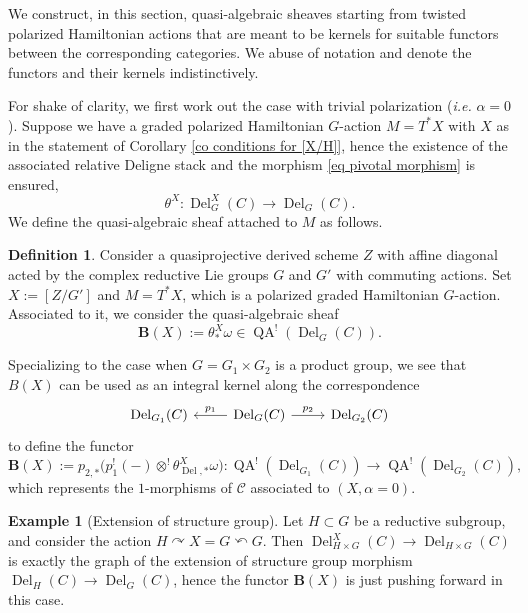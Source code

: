 \documentclass[11pt, a4paper]{amsart}
\numberwithin{equation}{section}
\theoremstyle{definition}
\newtheorem{definition}[theorem]{Definition}
\newtheorem{example}[theorem]{Example}
\theoremstyle{remark}
\DeclareMathOperator{\Del}{Del}
\DeclareMathOperator{\QA}{QA}
\newcommand{\Cc}{\mathcal{C}}
\newcommand{\bB}{\mathbf{B}}
\renewcommand{\to}{\longrightarrow}
\newcommand{\acts}{\curvearrowright}
\newcommand{\racts}{\curvearrowleft}
\begin{document}
We construct, in this section, quasi-algebraic sheaves starting from twisted polarized Hamiltonian actions that are meant to be kernels for suitable functors between the corresponding categories. We abuse of notation and denote the functors and their kernels indistinctively.  

For shake of clarity, we first work out the case with trivial polarization ({\it i.e.} $\alpha = 0$). Suppose we have a graded polarized Hamiltonian $G$-action $M = T^*X$ with $X$ as in the statement of Corollary \ref{co conditions for [X/H]}, hence the existence of the associated relative Deligne stack and the morphism \eqref{eq pivotal morphism} is ensured,
\[
\theta^X : \Del_G^X(C) \to \Del_G(C).
\]
We define the quasi-algebraic sheaf attached to $M$ as follows. 
\begin{definition}
    Consider a quasiprojective derived scheme $Z$ with affine diagonal acted by the complex reductive Lie groups $G$ and $G'$ with commuting actions. Set $X := [Z/G']$ and $M = T^*X$, which is a polarized graded Hamiltonian $G$-action. Associated to it, we consider the quasi-algebraic sheaf
    \begin{equation}
        \bB(X) := \theta^X_{*}\omega \in \QA^!(\Del_G(C)).
    \end{equation}
\end{definition}
Specializing to the case when $G = G_1 \times G_2$ is a product group, we see that $B(X)$ can be used as an integral kernel along the correspondence 
\begin{equation}
    \begin{tikzcd}
	{\Del_{G_1}(C)} & {\Del_G(C)} & {\Del_{G_2}(C)}
	\arrow["{p_1}"', from=1-2, to=1-1]
	\arrow["{p_2}", from=1-2, to=1-3]
\end{tikzcd}
\end{equation}
to define the functor
\begin{equation} \label{equation spectral quantization of 1-morphisms}
    \bB(X):= p_{2,*}\big(p_1^!(-) \otimes^! \theta^X_{\Del,*}\omega \big): \QA^!(\Del_{G_1}(C)) \to \QA^!(\Del_{G_2}(C)),
\end{equation}
which represents the $1$-morphisms of $\Cc$ associated to $(X, \alpha = 0)$.

\begin{example}[Extension of structure group]
    Let $H \subset G$ be a reductive subgroup, and consider the action $H \acts X = G \racts G$. Then $\Del_{H \times G}^X(C) \to \Del_{H \times G}(C)$ is exactly the graph of the extension of structure group morphism $\Del_H(C) \to \Del_G(C)$, hence the functor $\bB(X)$ is just pushing forward in this case.
\end{example}
\end{document}
